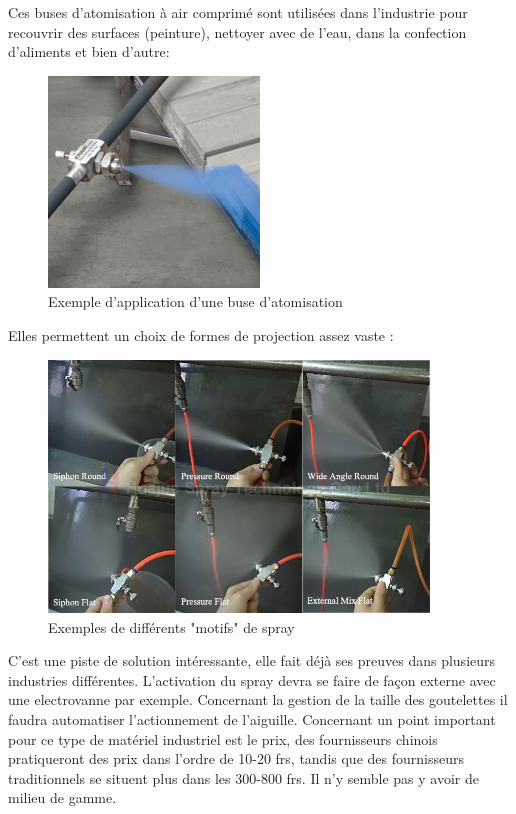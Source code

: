 Ces buses d'atomisation à air comprimé sont utilisées dans l'industrie pour recouvrir des surfaces (peinture), nettoyer avec de l'eau, dans la confection d'aliments et bien d'autre:
\begin{figure}[H]
    \centering
    \includegraphics[width=0.5\textwidth]{assets/figures/etat_art/buse spray.jpeg}
    \caption[Exemple d'application d'une buse d'atomisation]{Exemple d'application d'une buse d'atomisation \autocite{exemple_application_buse}\footnotemark}
\end{figure}
\newpage
Elles permettent un choix de formes de projection assez vaste :
\begin{figure}[H]
    \centering
    \includegraphics[width=0.9\textwidth]{assets/figures/etat_art/spray_patterns_example.jpeg}
    \caption[Exemples de différents "motifs" de spray]{Exemples de différents "motifs" de spray \autocite{Exemples_spray_patterns}\footnotemark}
\end{figure}
C'est une piste de solution intéressante, elle fait déjà ses preuves dans plusieurs industries différentes.
L'activation du spray devra se faire de façon externe avec une electrovanne par exemple. Concernant la gestion de la taille
des goutelettes il faudra automatiser l'actionnement de l'aiguille. Concernant un point important pour ce type de matériel industriel est le prix,
des fournisseurs chinois pratiqueront des prix dans l'ordre de 10-20 frs, tandis que des fournisseurs traditionnels se situent plus dans les 300-800 frs. Il n'y semble
pas y avoir de milieu de gamme.


